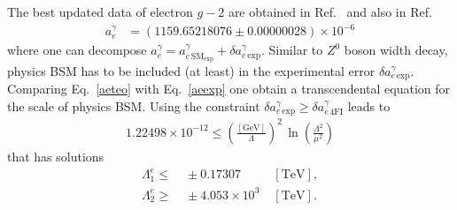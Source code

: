 The best updated data of electron $g-2$ are obtained in Ref.~\cite{Hanneke:2008tm} and also in Ref.~\cite{Beringer:1900zz}
\begin{align}
\label{aeexp}
 a_e^\gamma &= (1159.65218076\pm0.00000028)\times10^{-6} 
\end{align}
where one can decompose $a_e^\gamma = a_{e\,\text{SM}_\text{exp}}^\gamma + \delta a_{e\,\text{exp}}^\gamma$. Similar to $Z^0$ boson width decay, physics BSM has to be included (at least) in the experimental error $\delta a_{e\,\text{exp}}^\gamma$. Comparing Eq.~\eqref{aeteo} with Eq.~\eqref{aeexp} one obtain a transcendental equation for the scale of physics BSM. Using the constraint $\delta a_{e\,\text{exp}}^\gamma\geq\delta a_{e\,\text{4FI}}^\gamma$ leads to
\begin{align}
1.22498\times10^{-12} \leq \left(\frac{[\text{GeV}]}{\Lambda}\right)^2\,\ln\left(\frac{\Lambda^2}{\mu^2}\right) 
\end{align}
that has solutions
\begin{eqnarray}
 \label{lowscalefromgm2}
 \Lambda_1^{e} \leq&\; \pm0.17307\;&[\text{TeV}], \\
 \label{upscalefromgm2}
 \Lambda_2^{e} \geq&\; \pm4.053\times10^3\;&[\text{TeV}].
\end{eqnarray}

